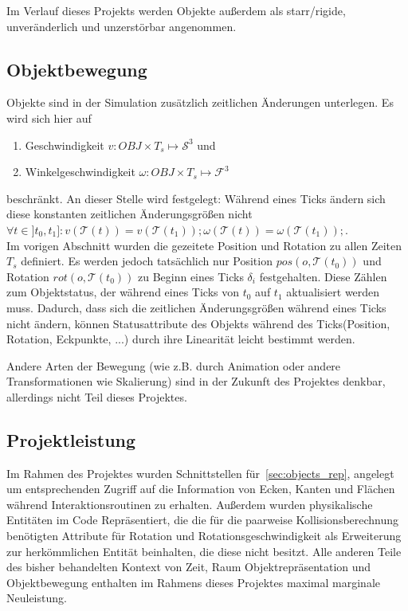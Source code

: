 Im Verlauf dieses Projekts werden Objekte außerdem als starr/rigide, unveränderlich und unzerstörbar angenommen.

\subsection{Objektbewegung}
\label{sec:objects_mov}
Objekte sind in der Simulation zusätzlich zeitlichen Änderungen unterlegen. Es wird sich hier auf
\begin{enumerate}
\item Geschwindigkeit $v: OBJ \times T_s \mapsto \mathcal{S}^3$  und
\item Winkelgeschwindigkeit $\omega : OBJ \times T_s \mapsto \mathcal{F}^3 $
\end{enumerate}
beschränkt.
An dieser Stelle wird festgelegt: Während eines Ticks ändern sich diese konstanten zeitlichen Änderungsgrößen nicht $\forall t \in ]t_0, t_1] : v(\mathcal{T}(t)) = v(\mathcal{T}( t_1 )); \omega(\mathcal{T}(t)) = \omega(\mathcal{T}(t_1));$.\\
Im vorigen Abschnitt wurden die gezeitete Position und Rotation zu allen Zeiten $T_s$ definiert.
Es werden jedoch tatsächlich nur Position $pos(o, \mathcal{T}(t_0))$ und Rotation $rot(o, \mathcal{T}(t_0))$ zu Beginn eines Ticks $\delta_i$ festgehalten. Diese Zählen zum Objektstatus, der während eines Ticks von $t_0$ auf $t_1$ aktualisiert werden muss. Dadurch, dass sich die zeitlichen Änderungsgrößen während eines Ticks nicht ändern, können Statusattribute des Objekts während des Ticks(Position, Rotation, Eckpunkte, ...) durch ihre Linearität leicht bestimmt werden.  

Andere Arten der Bewegung (wie z.B. durch Animation oder andere Transformationen wie Skalierung) sind in der Zukunft des Projektes denkbar, allerdings nicht Teil dieses Projektes.

\subsection{Projektleistung}
Im Rahmen des Projektes wurden Schnittstellen für~\ref{sec:objects_rep}, angelegt um entsprechenden Zugriff auf die Information von Ecken, Kanten und Flächen während Interaktionsroutinen zu erhalten. Außerdem wurden physikalische Entitäten im Code Repräsentiert, die die für die paarweise Kollisionsberechnung benötigten Attribute für Rotation und Rotationsgeschwindigkeit als Erweiterung zur herkömmlichen Entität beinhalten, die diese nicht besitzt. Alle anderen Teile des bisher behandelten Kontext von Zeit, Raum Objektrepräsentation und Objektbewegung enthalten im Rahmens dieses Projektes maximal marginale Neuleistung.



